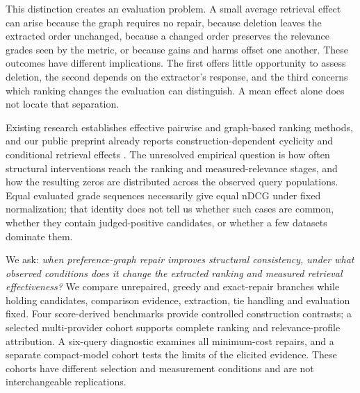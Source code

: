 \documentclass[pdflatex,iicol,sn-basic,Numbered]{sn-jnl}
\begin{document}
This distinction creates an evaluation problem. A small average retrieval effect can arise because the graph requires no repair, because deletion leaves the extracted order unchanged, because a changed order preserves the relevance grades seen by the metric, or because gains and harms offset one another. These outcomes have different implications. The first offers little opportunity to assess deletion, the second depends on the extractor's response, and the third concerns which ranking changes the evaluation can distinguish. A mean effect alone does not locate that separation.

Existing research establishes effective pairwise and graph-based ranking methods, and our public preprint already reports construction-dependent cyclicity and conditional retrieval effects \cite{vahidi2026retrievalpreprint}. The unresolved empirical question is how often structural interventions reach the ranking and measured-relevance stages, and how the resulting zeros are distributed across the observed query populations. Equal evaluated grade sequences necessarily give equal nDCG under fixed normalization; that identity does not tell us whether such cases are common, whether they contain judged-positive candidates, or whether a few datasets dominate them.

We ask: \emph{when preference-graph repair improves structural consistency, under what observed conditions does it change the extracted ranking and measured retrieval effectiveness?} We compare unrepaired, greedy and exact-repair branches while holding candidates, comparison evidence, extraction, tie handling and evaluation fixed. Four score-derived benchmarks provide controlled construction contrasts; a selected multi-provider cohort supports complete ranking and relevance-profile attribution. A six-query diagnostic examines all minimum-cost repairs, and a separate compact-model cohort tests the limits of the elicited evidence. These cohorts have different selection and measurement conditions and are not interchangeable replications.
\end{document}
